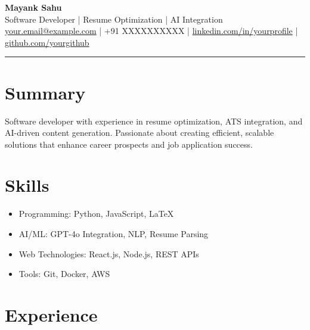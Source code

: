 \documentclass[a4paper,10pt]{article}
\begin{document}
\begin{center}

    {\LARGE \textbf{Mayank Sahu}} \\

    {\small Software Developer | Resume Optimization | AI Integration} \\

    \href{mailto:your.email@example.com}{your.email@example.com} | +91 XXXXXXXXXX | \href{https://linkedin.com/in/yourprofile}{linkedin.com/in/yourprofile} | \href{https://github.com/yourgithub}{github.com/yourgithub}

\end{center}



\hrule



\section*{Summary}

Software developer with experience in resume optimization, ATS integration, and AI-driven content generation. Passionate about creating efficient, scalable solutions that enhance career prospects and job application success.



\section*{Skills}

\begin{itemize}[noitemsep,topsep=0pt]

    \item Programming: Python, JavaScript, LaTeX

    \item AI/ML: GPT-4o Integration, NLP, Resume Parsing

    \item Web Technologies: React.js, Node.js, REST APIs

    \item Tools: Git, Docker, AWS

\end{itemize}



\section*{Experience}
\end{document}

